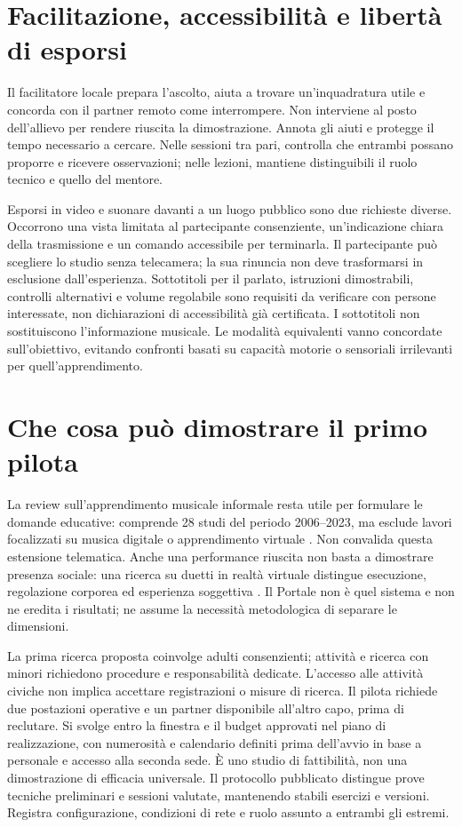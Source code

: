 \section{Facilitazione, accessibilità e libertà di esporsi}

Il facilitatore locale prepara l'ascolto, aiuta a trovare un'inquadratura
utile e concorda con il partner remoto come interrompere. Non interviene
al posto dell'allievo per rendere riuscita la dimostrazione. Annota gli
aiuti e protegge il tempo necessario a cercare. Nelle sessioni tra pari,
controlla che entrambi possano proporre e ricevere osservazioni; nelle
lezioni, mantiene distinguibili il ruolo tecnico e quello del mentore.

Esporsi in video e suonare davanti a un luogo pubblico sono due richieste
diverse. Occorrono una vista limitata al partecipante consenziente,
un'indicazione chiara della trasmissione e un comando accessibile per
terminarla. Il partecipante può scegliere lo studio senza telecamera;
la sua rinuncia non deve trasformarsi in esclusione dall'esperienza.
Sottotitoli per il parlato, istruzioni dimostrabili, controlli alternativi
e volume regolabile sono requisiti da verificare con persone interessate,
non dichiarazioni di accessibilità già certificata. I sottotitoli non
sostituiscono l'informazione musicale. Le modalità equivalenti vanno
concordate sull'obiettivo, evitando confronti basati su capacità motorie
o sensoriali irrilevanti per quell'apprendimento.

\section{Che cosa può dimostrare il primo pilota}

La review sull'apprendimento musicale informale resta utile per formulare
le domande educative: comprende 28 studi del periodo 2006--2023, ma esclude
lavori focalizzati su musica digitale o apprendimento virtuale
\cite{weatherly2025}. Non convalida questa estensione telematica. Anche
una performance riuscita non basta a dimostrare presenza sociale: una
ricerca su duetti in realtà virtuale distingue esecuzione, regolazione
corporea ed esperienza soggettiva \cite{remote_presence}. Il Portale non
è quel sistema e non ne eredita i risultati; ne assume la necessità
metodologica di separare le dimensioni.

La prima ricerca proposta coinvolge adulti consenzienti; attività e ricerca
con minori richiedono procedure e responsabilità dedicate. L’accesso alle
attività civiche non implica accettare registrazioni o misure di ricerca.
Il pilota richiede due postazioni operative e un partner disponibile
all'altro capo, prima di reclutare. Si svolge entro la finestra e il budget
approvati nel piano di realizzazione, con numerosità e calendario definiti
prima dell'avvio in base a personale e accesso alla seconda sede. È uno
studio di fattibilità, non una dimostrazione di efficacia universale.
Il protocollo pubblicato distingue prove tecniche preliminari e sessioni
valutate, mantenendo stabili esercizi e versioni. Registra configurazione,
condizioni di rete e ruolo assunto a entrambi gli estremi.

